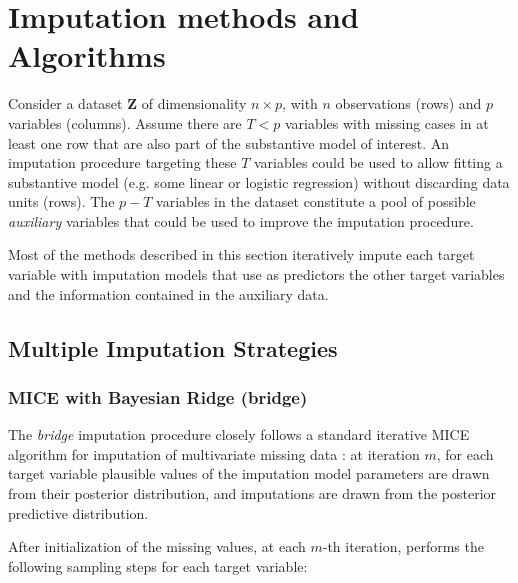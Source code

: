 \section{Imputation methods and Algorithms}


Consider a dataset $\bm{Z}$ of dimensionality $n \times p$, with $n$ observations (rows) and 
$p$ variables (columns). 
Assume there are $T < p$ variables with missing cases in at least one row that are also part of the substantive
model of interest. 
An imputation procedure targeting these $T$ variables could be used to allow fitting a substantive 
model (e.g. some linear or logistic regression) without discarding data units (rows).
The $p - T$ variables in the dataset constitute a pool of possible \emph{auxiliary} variables that
could be used to improve the imputation procedure.

Most of the methods described in this section iteratively impute each target variable with imputation models
that use as predictors the other target variables and the information contained in the auxiliary data. 

\subsection{Multiple Imputation Strategies}

\subsubsection{MICE with Bayesian Ridge (bridge)}
	The \emph{bridge} imputation procedure closely follows a standard iterative MICE algorithm for imputation of 
	multivariate missing data \citep[p. 120, algorithm 4.3]{vanBuuren:2012}: at iteration $m$, for each target 
	variable plausible values of the imputation model parameters are drawn from their posterior distribution, 
	and imputations are drawn from the posterior predictive distribution. 

	After initialization of the missing values, at each $m$-th iteration, performs the following sampling steps
	for each target variable:

